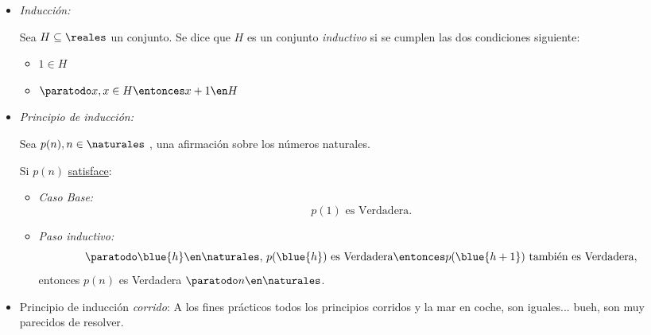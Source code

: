 \begin{itemize}[label=\tiny{}]
  \item \textit{Inducción:}\par
        Sea $H \subseteq \reales$ un conjunto. Se dice que $H$ es un conjunto \textit{inductivo} si se cumplen las dos condiciones siguiente:
        \begin{itemize}
          \item $1 \in H$
          \item $\paratodo x , x \in H \entonces x+1 \en H$
        \end{itemize}

  \item \textit{Principio de inducción:} \par
        Sea $p(n), n \in \naturales$ , una afirmación sobre los números naturales.\par
        Si $p(n)$ \underline{satisface}:
        \begin{itemize}[label=\small{}]
          \item \textit{Caso Base: }
                $$
                  p(1) \text{ es Verdadera}.
                $$

          \item \textit{Paso inductivo:}
                $$
                  \paratodo \blue{h} \en \naturales,\, p(\blue{h}) \text{ es Verdadera}
                  \entonces p(\blue{h+1}) \text{ también es Verdadera},
                $$
                entonces $p(n)$ es Verdadera $\paratodo n \en \naturales$.
        \end{itemize}

  \item Principio de inducción \textit{corrido}: A los fines prácticos todos los principios corridos y la mar en coche, son iguales... bueh,
        son muy parecidos de resolver.
\end{itemize}
